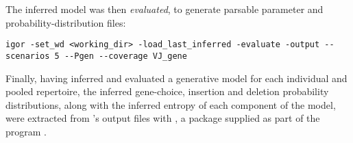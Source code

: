 \noindent The inferred model was then \textit{evaluated}, to generate parsable parameter and probability-distribution files:

\begin{lstlisting}
igor -set_wd <working_dir> -load_last_inferred -evaluate -output --scenarios 5 --Pgen --coverage VJ_gene
\end{lstlisting}

\noindent Finally, having inferred and evaluated a generative model for each individual and pooled repertoire, the inferred gene-choice, insertion and deletion probability distributions, along with the inferred entropy of each component of the model, were extracted from 's output files with , a  package supplied as part of the  program \parencite{marcou2018igor}.